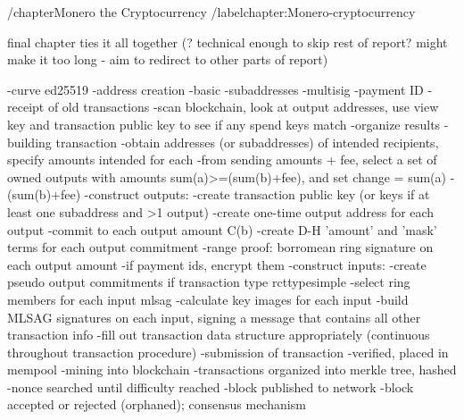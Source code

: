 /chapter{Monero the Cryptocurrency}
/label{chapter:Monero-cryptocurrency}

final chapter ties it all together (? technical enough to skip rest of report? might make it too long - aim to redirect to other parts of report)

-curve ed25519
-address creation
    -basic
    -subaddresses
    -multisig
    -payment ID
-receipt of old transactions
    -scan blockchain, look at output addresses, use view key and transaction public key to see if any spend keys match
    -organize results
-building transaction
    -obtain addresses (or subaddresses) of intended recipients, specify amounts intended for each
    -from sending amounts + fee, select a set of owned outputs with amounts sum(a)>=(sum(b)+fee), and set change = sum(a) - (sum(b)+fee)
    -construct outputs:
        -create transaction public key (or keys if at least one subaddress and >1 output)
        -create one-time output address for each output
        -commit to each output amount C(b)
        -create D-H 'amount' and 'mask' terms for each output commitment
        -range proof: borromean ring signature on each output amount
        -if payment ids, encrypt them
    -construct inputs:
        -create pseudo output commitments if transaction type rcttypesimple
        -select ring members for each input mlsag
        -calculate key images for each input
        -build MLSAG signatures on each input, signing a message that contains all other transaction info
    -fill out transaction data structure appropriately (continuous throughout transaction procedure)
-submission of transaction
    -verified, placed in mempool
-mining into blockchain
    -transactions organized into merkle tree, hashed
    -nonce searched until difficulty reached
    -block published to network
    -block accepted or rejected (orphaned); consensus mechanism

